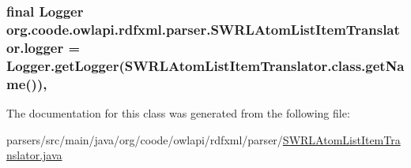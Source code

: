 \hypertarget{classorg_1_1coode_1_1owlapi_1_1rdfxml_1_1parser_1_1_s_w_r_l_atom_list_item_translator_a2c1863083de298455130919d2518f491}{
\subsubsection[{logger}]{\setlength{\rightskip}{0pt plus 5cm}final Logger org.\-coode.\-owlapi.\-rdfxml.\-parser.\-S\-W\-R\-L\-Atom\-List\-Item\-Translator.\-logger = Logger.\-get\-Logger(S\-W\-R\-L\-Atom\-List\-Item\-Translator.\-class.\-get\-Name())\hspace{0.3cm}{\ttfamily [static]}, {\ttfamily [private]}}}\label{classorg_1_1coode_1_1owlapi_1_1rdfxml_1_1parser_1_1_s_w_r_l_atom_list_item_translator_a2c1863083de298455130919d2518f491}


The documentation for this class was generated from the following file\-:\begin{DoxyCompactItemize}
\item 
parsers/src/main/java/org/coode/owlapi/rdfxml/parser/\hyperlink{_s_w_r_l_atom_list_item_translator_8java}{S\-W\-R\-L\-Atom\-List\-Item\-Translator.\-java}\end{DoxyCompactItemize}
